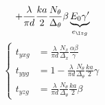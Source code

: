 \begin{refsection}
\begin{align*}
    +
    \frac{\lambda}{\pi d}
    \frac{ka}{2}
    \frac{N_\theta}{\Delta_\theta}
    \beta
    \underbrace{E_0 \gamma'}_{e_{\I zg}}
\end{align*}
\begin{equation}
    \left\lbrace
    \begin{aligned}
        t_{yxg}
        &= \frac{\lambda}{\pi d}
           \frac{N_x}{\Delta_x}
           \frac{\alpha \beta}{\gamma}
        \\
        t_{yyg}
        &= 1
           -
           \frac{\lambda}{\pi d}
           \frac{N_\theta}{\Delta_\theta}
           \frac{ka}{2}
           \gamma
        \\
        t_{yzg}
        &= \frac{\lambda}{\pi d}
           \frac{N_\theta}{\Delta_\theta}
           \frac{ka}{2}
           \beta
    \end{aligned}
    \right.
\end{equation}


\end{refsection}
